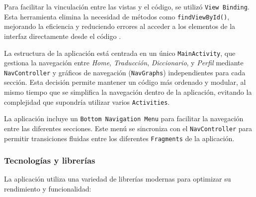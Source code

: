 Para facilitar la vinculación entre las vistas y el código, se utilizó \texttt{View Binding}. Esta herramienta elimina la necesidad de métodos como \texttt{findViewById()}, mejorando la eficiencia y reduciendo errores al acceder a los elementos de la interfaz directamente desde el código \cite{Ozaltun2022}.

La estructura de la aplicación está centrada en un único \texttt{MainActivity}, que gestiona la navegación entre \textit{Home}, \textit{Traducción}, \textit{Diccionario}, y \textit{Perfil} mediante \texttt{NavController} y gráficos de navegación (\texttt{NavGraphs}) independientes para cada sección. Esta decisión permite mantener un código más ordenado y modular, al mismo tiempo que se simplifica la navegación dentro de la aplicación, evitando la complejidad que supondría utilizar varios \texttt{Activities}.

La aplicación incluye un \texttt{Bottom Navigation Menu} para facilitar la navegación entre las diferentes secciones. Este menú se sincroniza con el \texttt{NavController} para permitir transiciones fluidas entre los diferentes \texttt{Fragments} de la aplicación.


\subsubsection{Tecnologías y librerías}

La aplicación utiliza una variedad de librerías modernas para optimizar su rendimiento y funcionalidad:

